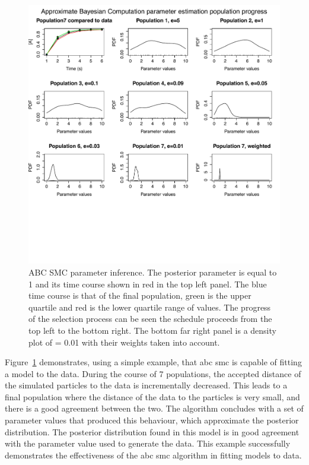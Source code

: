 \begin{figure}[htbp]
    \begin{center}
    \includegraphics[scale=0.6]{../../chapters/chapterIntroduction/images/abcsmc_ex.pdf}
    \caption[\acrshort{abc} \acrshort{smc} parameter inference example]{ABC SMC parameter inference. The posterior parameter is equal to 1 and its time course shown in red in the top left panel. The blue time course is that of the final population, green is the upper quartile and red is the lower quartile range of values. The progress of the selection process can be seen the \textepsilon schedule proceeds from the top left to the bottom right. The bottom far right panel is a density plot of \textepsilon = 0.01 with their weights taken into account.  }
    \label{fig:myABC true 1}
    \end{center}
\end{figure}
\clearpage

Figure~\ref{fig:myABC true 1} demonstrates, using a simple example, that \acrshort{abc} \acrshort{smc} is capable of fitting a model to the data. During the course of 7 populations, the accepted distance \textepsilon{} of the simulated particles to the data is incrementally decreased. This leads to a final population where the distance of the data to the particles is very small, and there is a good agreement between the two. The algorithm concludes with a set of parameter values that produced this behaviour, which approximate the posterior distribution. The posterior distribution found in this model is in good agreement with the parameter value used to generate the data. This example successfully demonstrates the effectiveness of the \acrshort{abc} \acrshort{smc} algorithm in fitting models to data. 

